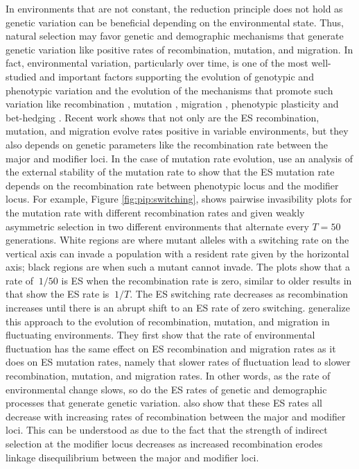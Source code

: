 \documentclass[11pt]{article}
\begin{document}
In environments that are not constant, the reduction principle does not hold as genetic variation can be beneficial depending on the environmental state. Thus, natural selection may favor genetic and demographic mechanisms that generate genetic variation like positive rates of recombination, mutation, and migration. In fact, environmental variation, particularly over time, is one of the most well-studied and important factors supporting the evolution of genotypic and phenotypic variation and the evolution of the mechanisms that promote such variation like recombination \cite{Charlesworth:1976,Sasaki:Iwasa:1987,Otto:Michalakis:1998}, mutation \cite{Leigh:1970,Ishii:Matsuda:1989,Lachmann:Jablonka:1996}, migration \cite{Gillespie:1981,McPeek:Holt:1992,Blanquart:Gandon:2011}, phenotypic plasticity \cite{Caswell:1983,Via:Lande:1985,Gavrilets:Scheiner:1993,Jong:1995} and bet-hedging \cite{Slatkin:1974,Seger:Brockmann:1987,Kussell:Leibler:2005,Salathe:VanCleve:2009}. Recent work shows that not only are the ES recombination, mutation, and migration evolve rates positive in variable environments, but they also depends on genetic parameters like the recombination rate between the major and modifier loci. In the case of mutation rate evolution, \citeauthor{Liberman:VanCleve:2011} \cite{Liberman:VanCleve:2011} use an analysis of the external stability of the mutation rate to show that the ES mutation rate depends on the recombination rate between phenotypic locus and the modifier locus. For example, Figure \ref{fig:pip:switching}, shows pairwise invasibility plots for the mutation rate with different recombination rates and given weakly asymmetric selection in two different environments that alternate every $T=50$ generations. White regions are where mutant alleles with a switching rate on the vertical axis can invade a population with a resident rate given by the horizontal axis; black regions are when such a mutant cannot invade. The plots show that a rate of $~1/50$ is ES when the recombination rate is zero, similar to older results in \cite{Leigh:1970,Lachmann:Jablonka:1996} that show the ES rate is $~1/T$. The ES switching rate decreases as recombination increases until there is an abrupt shift to an ES rate of zero switching. \citeauthor{Carja:Liberman:2014} \cite{Carja:Liberman:2014} generalize this approach to the evolution of recombination, mutation, and migration in fluctuating environments. They first show that the rate of environmental fluctuation has the same effect on ES recombination and migration rates as it does on ES mutation rates, namely that slower rates of fluctuation lead to slower recombination, mutation, and migration rates. In other words, as the rate of environmental change slows, so do the ES rates of genetic and demographic processes that generate genetic variation. \citeauthor{Carja:Liberman:2014} also show that these ES rates all decrease with increasing rates of recombination between the major and modifier loci. This can be understood as due to the fact that the strength of indirect selection at the modifier locus decreases as increased recombination erodes linkage disequilibrium between the major and modifier loci.
\end{document}
